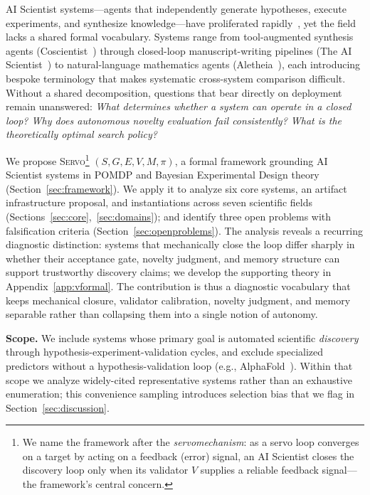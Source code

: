 \documentclass{article}
\newcommand{\sgmvpi}{$(S, G, E, V, M, \pi)$}
\newcommand{\framework}{\textsc{Servo}}
\begin{document}
AI Scientist systems---agents that independently generate hypotheses, execute experiments, and synthesize knowledge---have proliferated rapidly~\citep{boiko2023emergent,lu2024aiscientist,lu2026aiscientist,schmidgall2025agentlab,google2026aletheia,liu2026lasthuman}, yet the field lacks a shared formal vocabulary. Systems range from tool-augmented synthesis agents (Coscientist~\citep{boiko2023emergent}) through closed-loop manuscript-writing pipelines (The AI Scientist~\citep{lu2024aiscientist,lu2026aiscientist}) to natural-language mathematics agents (Aletheia~\citep{google2026aletheia}), each introducing bespoke terminology that makes systematic cross-system comparison difficult. Without a shared decomposition, questions that bear directly on deployment remain unanswered: \textit{What determines whether a system can operate in a closed loop? Why does autonomous novelty evaluation fail consistently? What is the theoretically optimal search policy?}

We propose \framework{}\footnote{We name the framework after the \emph{servomechanism}: as a servo loop converges on a target by acting on a feedback (error) signal, an AI Scientist closes the discovery loop only when its validator $V$ supplies a reliable feedback signal---the framework's central concern.} \sgmvpi{}, a formal framework grounding AI Scientist systems in POMDP and Bayesian Experimental Design theory (Section~\ref{sec:framework}). We apply it to analyze six core systems, an artifact infrastructure proposal, and instantiations across seven scientific fields (Sections~\ref{sec:core},~\ref{sec:domains}); and identify three open problems with falsification criteria (Section~\ref{sec:openproblems}). The analysis reveals a recurring diagnostic distinction: systems that mechanically close the loop differ sharply in whether their acceptance gate, novelty judgment, and memory structure can support trustworthy discovery claims; we develop the supporting theory in Appendix~\ref{app:vformal}. The contribution is thus a diagnostic vocabulary that keeps mechanical closure, validator calibration, novelty judgment, and memory separable rather than collapsing them into a single notion of autonomy.

\noindent\textbf{Scope.} We include systems whose primary goal is automated scientific \emph{discovery} through hypothesis-experiment-validation cycles, and exclude specialized predictors without a hypothesis-validation loop (e.g., AlphaFold~\citep{jumper2021alphafold}). Within that scope we analyze widely-cited representative systems rather than an exhaustive enumeration; this convenience sampling introduces selection bias that we flag in Section~\ref{sec:discussion}.
\end{document}
